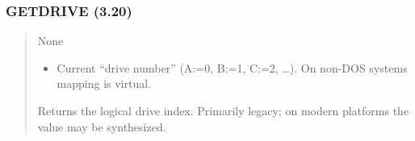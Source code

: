 \documentclass[letterpaper,10pt,english]{sphinxmanual}
\begin{document}
\subsubsection{GETDRIVE (3.20)}
\label{\detokenize{ppl:id2}}\begin{quote}

\sphinxAtStartPar
{}
\begin{description}
\sphinxAtStartPar
None

\begin{itemize}
\item {} 
\sphinxAtStartPar
{} \textendash{} Current “drive number”
(A:=0, B:=1, C:=2, …). On non‑DOS systems mapping is virtual.

\end{itemize}

\sphinxAtStartPar
Returns the logical drive index. Primarily legacy; on modern platforms the value may be synthesized.

\end{description}

\sphinxAtStartPar
{}
\begin{quote}

\begin{sphinxVerbatim}[commandchars=\\\{\}]
 
  
     
\end{sphinxVerbatim}
\end{quote}
\end{quote}
\end{document}
